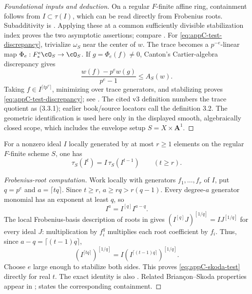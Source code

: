 \begin{proof}[Foundational inputs and deduction]
On a regular \(F\)-finite affine ring, containment follows from
\(I\subset\tau(I)\), which can be read directly from Frobenius roots.
Subadditivity is \cite[Proposition~2.11(4)]{BMS08}.  Applying these at a
common sufficiently divisible stabilization index proves the two
asymptotic assertions; compare
\cite[Section~3 and Proposition~3.1]{MustataTest}.  For
\eqref{eq:appC-test-discrepancy}, trivialize \(\omega_S\) near the center
of \(w\).  The trace becomes a \(p^{-e}\)-linear map
\(\Phi_e:F_*^e\cO_S\to\cO_S\).  If \(g=\Phi_e(f)\ne0\), Canton's
Cartier-algebra discrepancy gives
\[
 \frac{w(f)-p^ew(g)}{p^e-1}\leq A_S(w).
\]
Taking \(f\in I^{\lceil tp^e\rceil}\), minimizing over trace generators,
and stabilizing proves \eqref{eq:appC-test-discrepancy}; see
\cite[Definition~3.3 and Proposition~4.1 in arXiv v3]{Canton}.
The cited v3 definition numbers the trace quotient as (3.3.1); earlier
book/source locators call the definition 3.2.  The geometric identification
is used here only in the displayed smooth, algebraically closed scope,
which includes the envelope setup \(S=X\times\mathbf A^1\).
\end{proof}

\begin{theorem}\label{thm:appC-skoda-test}
For a nonzero ideal \(I\) locally generated by at most \(r\geq1\)
elements on the regular \(F\)-finite scheme \(S\), one has
\[
 \tau_S(I^t)=I\,\tau_S(I^{t-1})
 \qquad(t\geq r).
\tag{C.25}\label{eq:appC-skoda-test}
\]
\end{theorem}

\begin{proof}[Frobenius-root computation]
Work locally with generators \(f_1,\ldots,f_r\) of \(I\), put
\(q=p^e\) and \(a=\lceil tq\rceil\).  Since \(t\geq r\),
\(a\geq rq>r(q-1)\).  Every degree-\(a\) generator monomial has
an exponent at least \(q\), so
\[
                    I^a=I^{[q]}I^{a-q}.
\]
The local Frobenius-basis description of roots in
\cite[Proposition~2.5]{BMS08} gives
\((I^{[q]}J)^{[1/q]}=I J^{[1/q]}\) for every ideal \(J\):
multiplication by \(f_i^q\) multiplies each root coefficient by \(f_i\).
Thus, since \(a-q=\lceil(t-1)q\rceil\),
\[
 (I^{\lceil tq\rceil})^{[1/q]}
       =I(I^{\lceil(t-1)q\rceil})^{[1/q]}.
\]
Choose \(e\) large enough to stabilize both sides.  This proves
\eqref{eq:appC-skoda-test} directly for real \(t\).
The exact identity is also \cite[Proposition~2.25]{BMS08}.
Related Brian\c con--Skoda properties appear in
\cite[Theorem~6.9(iii)]{ST12}; \cite[Theorem~2.1]{HY03} states
the corresponding containment.
\end{proof}

